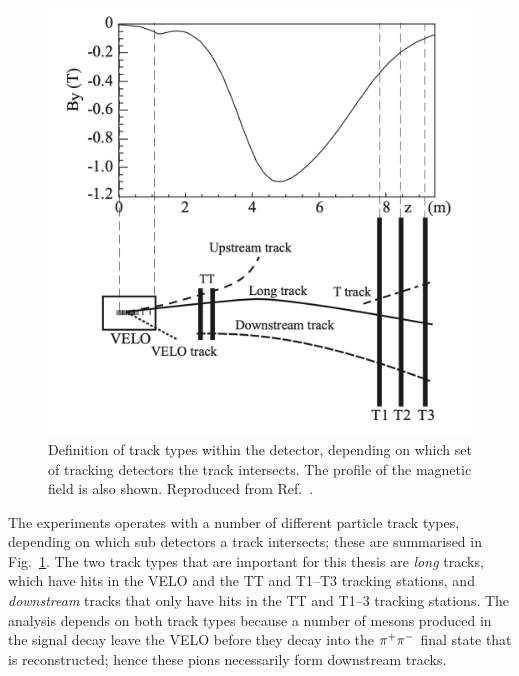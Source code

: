 \begin{figure}[tb]
    \centering
    \includegraphics[width=0.75\columnwidth]{figures/detector/track_types.png}
    \caption{Definition of track types within the \lhcb detector, depending on which set of tracking detectors the track intersects. The profile of the magnetic field  is also shown. Reproduced from Ref.~\cite{LHCb-Performance}.}
    \label{fig:track_types}
\end{figure}

The \lhcb experiments operates with a number of different particle track types, depending on which sub detectors a track intersects; these are summarised in Fig.~\ref{fig:track_types}. The two track types that are important for this thesis are \emph{long} tracks, which have hits in the VELO and the TT and T1--T3 tracking stations, and \emph{downstream} tracks that only have hits in the TT and T1--3 tracking stations. The analysis depends on both track types because a number of \KS mesons produced in the signal decay leave the VELO before they decay into the ${{\pi}^+}{{\pi}^-}$ final state that is reconstructed; hence these pions necessarily form downstream tracks.

